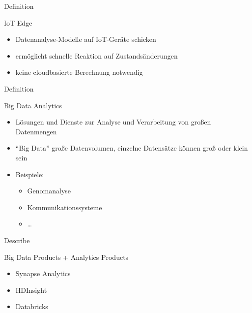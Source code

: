 \documentclass{scrartcl}
\newenvironment{flashcard}[2][]{%
    #1
    \vfill
    \centerline{\Large{#2}}
    \vfill
\newpage
}
{\newpage}
\begin{document}
    \begin{flashcard}[Definition]{IoT Edge}
        \begin{itemize}
            \item Datenanalyse-Modelle auf IoT-Geräte schicken
            \item ermöglicht schnelle Reaktion auf Zustandsänderungen
            \item keine cloudbasierte Berechnung notwendig
        \end{itemize}
    \end{flashcard}

    \begin{flashcard}[Definition]{Big Data Analytics}
        \begin{itemize}
            \item Lösungen und Dienste zur Analyse und Verarbeitung von großen Datenmengen
            \item ``Big Data'' große Datenvolumen, einzelne Datensätze können groß oder klein sein
            \item Beispiele:
                \begin{itemize}
                    \item Genomanalyse
                    \item Kommunikationssysteme
                    \item \ldots
                \end{itemize}
        \end{itemize}
    \end{flashcard}

    \begin{flashcard}[Describe]{Big Data Products + Analytics Products}
        \begin{itemize}
            \item Synapse Analytics
            \item HDInsight
            \item Databricks
        \end{itemize}

    \end{flashcard}
\end{document}
